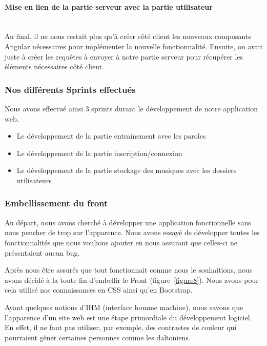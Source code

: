 \documentclass[12pt,french]{article}
\begin{document}
\paragraph{Mise en lien de la partie serveur avec la partie utilisateur \\\\}


Au final, il ne nous restait plus qu'à créer côté client les nouveaux composants Angular nécessaires pour implémenter la nouvelle fonctionnalité. Ensuite, on avait juste à créer les requêtes à envoyer à notre partie serveur pour récupérer les éléments nécessaires côté client.

\subsubsection{Nos différents Sprints effectués}

Nous avons effectué ainsi 3 \gls{sprint}s durant le développement de notre application web.

\begin{itemize}
	\item Le développement de la partie entrainement avec les paroles
	\item Le développement de la partie inscription/connexion
	\item Le développement de la partie stockage des musiques avec les dossiers utilisateurs
\end{itemize}


\subsubsection{Embellissement du front}

Au départ, nous avons cherché à développer une application fonctionnelle sans nous pencher de trop sur l'apparence. Nous avons essayé de développer toutes les fonctionnalités que nous voulions ajouter en nous assurant que celles-ci ne présentaient aucun bug.

\medskip

Après nous être assurés que tout fonctionnait comme nous le souhaitions, nous avons décidé à la toute fin d'embellir le \gls{Front} (figure~\ref{figure8}). Nous avons pour cela utilisé nos connaissances en \gls{CSS} ainsi qu'en Bootstrap.

\medskip

Ayant quelques notions d'IHM (interface homme machine), nous savons que l'apparence d'un site web est une étape primordiale du développement logiciel. En effet, il ne faut pas utiliser, par exemple, des contrastes de couleur qui pourraient gêner certaines personnes comme les daltoniens.
\end{document}
